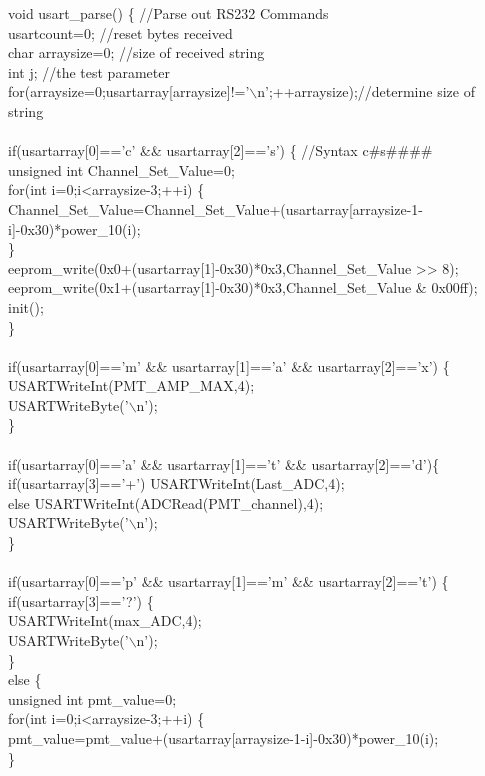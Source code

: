 void usart\_parse() \{\tabto*{7.5cm} //Parse out RS232 Commands\\
\tabto*{.5cm}	usartcount=0;  	//reset bytes received \\
\tabto*{.5cm}	char arraysize=0;  //size of received string\\
\tabto*{.5cm}	int j;  		//the test parameter\\	
\tabto*{.5cm}	for(arraysize=0;usartarray[arraysize]!='$\backslash$n';++arraysize);\tabto*{10.5cm}//determine size of string\\
\\
\tabto*{.5cm}    if(usartarray[0]=='c' \&\& usartarray[2]=='s') \{ \tabto*{10.5cm} //Syntax c\#s\#\#\#\#\\ 
\tabto*{1cm}	unsigned int Channel\_Set\_Value=0; \\
\tabto*{1cm}  	for(int i=0;i<arraysize-3;++i) \{\\ \tabto*{1.5cm}Channel\_Set\_Value=Channel\_Set\_Value+(usartarray[arraysize-1-i]-0x30)*power\_10(i);\\
\tabto*{1cm} \}\\
\tabto*{1cm}eeprom\_write(0x0+(usartarray[1]-0x30)*0x3,Channel\_Set\_Value >> 8);\\
\tabto*{1cm}eeprom\_write(0x1+(usartarray[1]-0x30)*0x3,Channel\_Set\_Value \& 0x00ff);\\ 
\tabto*{1cm}init();\\
\tabto*{.5cm}\}\\
\\
\tabto*{.5cm}if(usartarray[0]=='m' \&\& usartarray[1]=='a' \&\& usartarray[2]=='x') \{\\
\tabto*{1cm}	USARTWriteInt(PMT\_AMP\_MAX,4);\\
\tabto*{1cm}	USARTWriteByte('$\backslash$n');\\
\tabto*{.5cm}\}\\
\\
\tabto*{.5cm}    if(usartarray[0]=='a' \&\& usartarray[1]=='t' \&\& usartarray[2]=='d')\{\\	
\tabto*{1cm}	if(usartarray[3]=='+') USARTWriteInt(Last\_ADC,4);\\
\tabto*{1cm}	else USARTWriteInt(ADCRead(PMT\_channel),4);\\	
\tabto*{1cm}	USARTWriteByte('$\backslash$n');\\
\tabto*{.5cm} \}\\
\\
\tabto*{.5cm}    if(usartarray[0]=='p' \&\& usartarray[1]=='m' \&\& usartarray[2]=='t') \{\\	
\tabto*{1cm}	if(usartarray[3]=='?') \{\\
\tabto*{1.5cm}		USARTWriteInt(max\_ADC,4);\\
\tabto*{1.5cm}		USARTWriteByte('$\backslash$n');\\
\tabto*{1cm}	\}\\
\tabto*{1cm}  else \{\\
\tabto*{1.5cm}	unsigned int pmt\_value=0;\\	
\tabto*{1.5cm}	for(int i=0;i<arraysize-3;++i) \{\\ 
\tabto*{2cm} pmt\_value=pmt\_value+(usartarray[arraysize-1-i]-0x30)*power\_10(i);\\
\tabto*{1.5cm} \}\\

